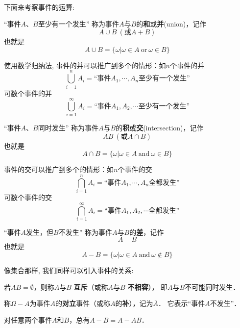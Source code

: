 下面来考察事件的运算: 

\begin{definition}[事件的并]
    
        “事件$A$、$B$至少有一个发生”
    称为事件$A$与$B$的\textbf{和}或\textbf{并}(union)，记作
    $$A\cup B \ (\text{或}A+B)$$
    也就是
    $$A\cup B=\{\omega | \omega\in A \ \text{or}\ \omega\in B\}$$
\end{definition}

\begin{remark}
    使用数学归纳法, 事件的并可以推广到多个的情形：如$n$个事件的并
    $$\bigcup_{i=1}^{n} A_i =\text{“事件$A_1, \cdots, A_n$至少有一个发生”}$$
    可数个事件的并
    $$\bigcup_{i=1}^{\infty} A_i =\text{“事件$A_1, A_2, \cdots$至少有一个发生”}$$
\end{remark}

\begin{definition}
        “事件$A$、$B$同时发生”
    称为事件$A$与$B$的\textbf{积}或\textbf{交}(intersection)，记作
    $$AB \ (\text{或}A\cap B)$$
    也就是$$A\cap B=\{\omega | \omega\in A \ \text{and}\ \omega\in B\}$$
\end{definition}

\begin{remark}
    事件的交可以推广到多个的情形：如$n$个事件的交
    $$\bigcap_{i=1}^{n} A_i =\text{“事件$A_1, \cdots, A_n$全都发生”}$$
    可数个事件的交
    $$\bigcap_{i=1}^{\infty} A_i =\text{“事件$A_1, A_2, \cdots$全都发生”}$$
\end{remark}

\begin{definition}
    “事件$A$发生，但$B$不发生”
称为事件$A$与$B$的\textbf{差}，记作
$$A-B$$
也就是
$$A- B=\{\omega | \omega\in A \ \text{and}\ \omega\notin B\}$$
\end{definition}

像集合那样, 我们同样可以引入事件的关系: 

\begin{definition}
    若$AB=\emptyset$，则称$A$与$B$ \textbf{互斥}（或称$A$与$B$ \textbf{不相容}），%
    即$A$与$B$不可能同时发生．
\end{definition}

\begin{definition}
    称$\Omega-A$为事件$A$的\textbf{对立}事件（或称$A$的\textbf{补}），记为$\overline{A}$．
    它表示“事件$A$不发生”．
\end{definition}

\begin{proposition}
        对任意两个事件$A$和$B$，总有$ A-B=A-AB$．
\end{proposition}

